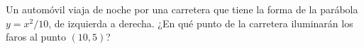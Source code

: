 \item Un automóvil viaja de noche por una carretera que tiene la forma de la parábola $y = x^2/10$, de izquierda a derecha. ¿En qué punto de la carretera iluminarán los faros al punto $(10, 5)$?
